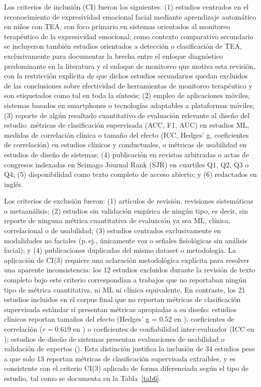 \documentclass[3p,twocolumn,times]{elsarticle}
\begin{document}
	Los criterios de inclusión (CI) fueron los siguientes: (1) estudios centrados en
	el reconocimiento de expresividad emocional facial mediante aprendizaje automático
	en niños con TEA, con foco primario en sistemas orientados al monitoreo
	terapéutico de la expresividad emocional; como contexto comparativo secundario se
	incluyeron también estudios orientados a detección o clasificación de TEA,
	exclusivamente para documentar la brecha entre el enfoque diagnóstico predominante
	en la literatura y el enfoque de monitoreo que motiva esta revisión, con la
	restricción explícita de que dichos estudios secundarios quedan excluidos de las
	conclusiones sobre efectividad de herramientas de monitoreo terapéutico y son
	etiquetados como tal en toda la síntesis; (2) empleo de aplicaciones móviles,
	sistemas basados en smartphones o tecnologías adaptables a plataformas móviles;
	(3) reporte de algún resultado cuantitativo de evaluación relevante al diseño del
	estudio: métricas de clasificación supervisada (ACC, F1, AUC) en estudios ML,
	medidas de correlación clínica o tamaño del efecto (ICC, Hedges' g, coeficientes
	de correlación) en estudios clínicos y conductuales, o métricas de usabilidad en
	estudios de diseño de sistemas; (4) publicación en revistas arbitradas o actas de
	congresos indexadas en Scimago Journal Rank (SJR) en cuartiles Q1, Q2, Q3 o Q4;
	(5) disponibilidad como texto completo de acceso abierto; y (6) redactados en
	inglés.
	
	Los criterios de exclusión fueron: (1) artículos de revisión, revisiones
	sistemáticas o metaanálisis; (2) estudios sin validación empírica de ningún tipo,
	es decir, sin reporte de ninguna métrica cuantitativa de evaluación ya sea ML,
	clínica, correlacional o de usabilidad; (3) estudios centrados exclusivamente en
	modalidades no faciales (p.\,ej., únicamente voz o señales fisiológicas sin
	análisis facial); y (4) publicaciones duplicadas del mismo dataset o metodología.
	La aplicación de CI(3) requiere una aclaración metodológica explícita para
	resolver una aparente inconsistencia: los 12 estudios excluidos durante la
	revisión de texto completo bajo este criterio correspondían a trabajos que no
	reportaban ningún tipo de métrica cuantitativa, ni ML ni clínica equivalente. En
	contraste, los 21 estudios incluidos en el corpus final que no reportan métricas
	de clasificación supervisada estándar sí presentan métricas apropiadas a su
	diseño: estudios clínicos reportan tamaños del efecto (Hedges' g = 0.52 en
	\cite{Lecciso2021}), coeficientes de correlación ($r = 0.619$ en \cite{He2019})
	o coeficientes de confiabilidad inter-evaluador (ICC en
	\cite{Rudovic2018,Rudovic2019}); estudios de diseño de sistemas presentan
	evaluaciones de usabilidad o validación de expertos
	(\cite{Levy2024,Almeida2019}). Esta distinción justifica la inclusión de
	34 estudios pese a que solo 13 reportan métricas de clasificación supervisada
	extraíbles, y es consistente con el criterio CI(3) aplicado de forma diferenciada
	según el tipo de estudio, tal como se documenta en la Tabla~\ref{tab6}.
	
\end{document}

